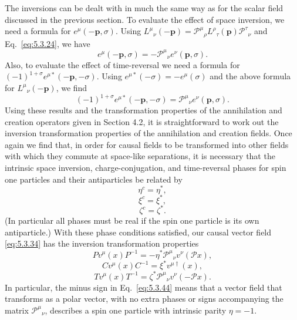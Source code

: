 The inversions can be dealt with in much the same way as for the scalar field
discussed in the previous section. To evaluate the effect of space inversion,
we need a formula for $e^\mu(-\mathbf{p},\sigma)$. Using
$L^\mu{}_{\nu}(-\mathbf{p})=\mathcal{P}^\mu{}_{\rho}
L^\rho{}_{\tau}(\mathbf{p})\mathcal{P}^\tau{}_{\nu}$ and Eq.~\eqref{eq:5.3.24}, we have
\begin{equation}
  e^\mu(-\mathbf{p},\sigma)=-\mathcal{P}^\mu{}_{\nu}
  e^\nu(\mathbf{p},\sigma).
  \tag{5.3.39}\label{eq:5.3.39}
\end{equation}
Also, to evaluate the effect of time-reversal we need a formula for
$(-1)^{1+\sigma}e^{\mu*}(-\mathbf{p},-\sigma)$. Using
$e^{\mu*}(-\sigma)=-e^\mu(\sigma)$ and the above formula for
$L^\mu{}_{\nu}(-\mathbf{p})$, we find
\begin{equation}
  (-1)^{1+\sigma}e^{\mu*}(-\mathbf{p},-\sigma)
  =\mathcal{P}^\mu{}_{\nu}e^\nu(\mathbf{p},\sigma).
  \tag{5.3.40}\label{eq:5.3.40}
\end{equation}
Using these results and the transformation properties of the annihilation and
creation operators given in Section 4.2, it is straightforward to work out the
inversion transformation properties of the annihilation and creation fields.
Once again we find that, in order for causal fields to be transformed into
other fields with which they commute at space-like separations, it is necessary
that the intrinsic space inversion, charge-conjugation, and time-reversal phases
for spin one particles and their antiparticles be related by
\begin{equation}
  \eta^c=\eta^*,
  \tag{5.3.41}\label{eq:5.3.41}
\end{equation}
\begin{equation}
  \xi^c=\xi^*,
  \tag{5.3.42}\label{eq:5.3.42}
\end{equation}
\begin{equation}
  \zeta^c=\zeta^*.
  \tag{5.3.43}\label{eq:5.3.43}
\end{equation}
(In particular all phases must be real if the spin one particle is its own
antiparticle.) With these phase conditions satisfied, our causal vector field
\eqref{eq:5.3.34} has the inversion transformation properties
\begin{equation}
  Pv^\mu(x)P^{-1}=-\eta^*\mathcal{P}^\mu{}_{\nu}
  v^\nu(\mathcal{P}x),
  \tag{5.3.44}\label{eq:5.3.44}
\end{equation}
\begin{equation}
  Cv^\mu(x)C^{-1}=\xi^*v^{\mu\dagger}(x),
  \tag{5.3.45}\label{eq:5.3.45}
\end{equation}
\begin{equation}
  Tv^\mu(x)T^{-1}=\zeta^*\mathcal{P}^\mu{}_{\nu}
  v^\nu(-\mathcal{P}x).
  \tag{5.3.46}\label{eq:5.3.46}
\end{equation}
In particular, the minus sign in Eq.~\eqref{eq:5.3.44} means that a vector field that
transforms as a polar vector, with no extra phases or signs accompanying the
matrix $\mathcal{P}^\mu{}_{\nu}$, describes a spin one particle with intrinsic
parity $\eta=-1$.
